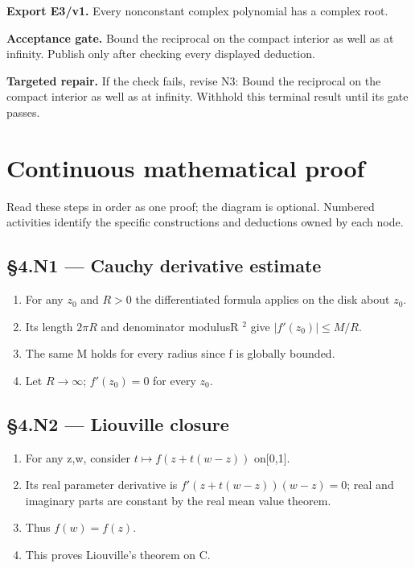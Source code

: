 \documentclass[preprint,12pt,aps,pra,showkeys,amsmath,amssymb,superscriptaddress,floatfix]{revtex4-2}
\theoremstyle{definition}
\theoremstyle{remark}
\newcommand{\field}[2]{\par\smallskip\noindent\textbf{#1.} #2\par}
\begin{document}
\field{Export E3/v1}{Every nonconstant complex polynomial has a complex root.}

\field{Acceptance gate}{Bound the reciprocal on the compact interior as well as at infinity.
Publish only after checking every displayed deduction.}

\field{Targeted repair}{If the check fails, revise N3: Bound the reciprocal on the compact
interior as well as at infinity. Withhold this terminal result until its
gate passes.}

\endgroup\clearpage\section{Continuous mathematical proof}\label{sec:proof}

Read these steps in order as one proof; the diagram is optional.
Numbered activities identify the specific constructions and deductions
owned by each node.

\subsection{§4.N1 --- Cauchy derivative
estimate}\label{n1-cauchy-derivative-estimate}

\begin{enumerate}
\def\labelenumi{\arabic{enumi}.}
\item
  For any \(z_{0}\) and \(R>0\) the differentiated formula applies on
  the disk about \(z_{0}\).
\item
  Its length \(2\pi R\) and denominator modulusR \(^{2}\) give
  \(|f'(z_{0})|\le M/R\).
\item
  The same M holds for every radius since f is globally bounded.
\item
  Let \(R\to \infty\); \(f'(z_{0})=0\) for every \(z_{0}\).
\end{enumerate}

\subsection{§4.N2 --- Liouville closure}\label{n2-liouville-closure}

\begin{enumerate}
\def\labelenumi{\arabic{enumi}.}
\item
  For any z,w, consider \(t\mapsto f(z+t(w-z))\) on{[}0,1{]}.
\item
  Its real parameter derivative is \(f'(z+t(w-z))(w-z)=0\); real and
  imaginary parts are constant by the real mean value theorem.
\item
  Thus \(f(w)=f(z)\).
\item
  This proves Liouville's theorem on C.
\end{enumerate}
\end{document}
